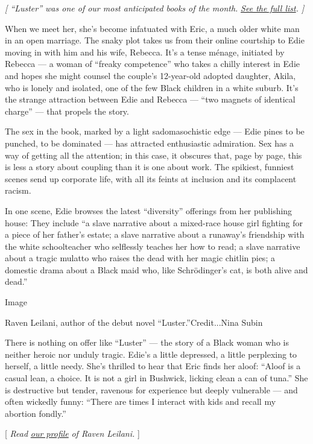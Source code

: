 \emph{{[} ``Luster'' was one of our most anticipated books of the
month.}
\href{https://www.nytimes.com/2020/07/30/books/new-august-books.html}{\emph{See
the full list}}\emph{. {]}}

When we meet her, she's become infatuated with Eric, a much older white
man in an open marriage. The snaky plot takes us from their online
courtship to Edie moving in with him and his wife, Rebecca. It's a tense
ménage, initiated by Rebecca --- a woman of ``freaky competence'' who
takes a chilly interest in Edie and hopes she might counsel the couple's
12-year-old adopted daughter, Akila, who is lonely and isolated, one of
the few Black children in a white suburb. It's the strange attraction
between Edie and Rebecca --- ``two magnets of identical charge'' ---
that propels the story.

The sex in the book, marked by a light sadomasochistic edge --- Edie
pines to be punched, to be dominated --- has attracted enthusiastic
admiration. Sex has a way of getting all the attention; in this case, it
obscures that, page by page, this is less a story about coupling than it
is one about work. The spikiest, funniest scenes send up corporate life,
with all its feints at inclusion and its complacent racism.

In one scene, Edie browses the latest ``diversity'' offerings from her
publishing house: They include ``a slave narrative about a mixed-race
house girl fighting for a piece of her father's estate; a slave
narrative about a runaway's friendship with the white schoolteacher who
selflessly teaches her how to read; a slave narrative about a tragic
mulatto who raises the dead with her magic chitlin pies; a domestic
drama about a Black maid who, like Schrödinger's cat, is both alive and
dead.''

Image

Raven Leilani, author of the debut novel ``Luster.''Credit...Nina Subin

There is nothing on offer like ``Luster'' --- the story of a Black woman
who is neither heroic nor unduly tragic. Edie's a little depressed, a
little perplexing to herself, a little needy. She's thrilled to hear
that Eric finds her aloof: ``Aloof is a casual lean, a choice. It is not
a girl in Bushwick, licking clean a can of tuna.'' She is destructive
but tender, ravenous for experience but deeply vulnerable --- and often
wickedly funny: ``There are times I interact with kids and recall my
abortion fondly.''

{[} \emph{Read}
\href{https://www.nytimes.com/2020/07/31/books/raven-leilani-luster.html}{\emph{our
profile}} \emph{of Raven Leilani.} {]}

